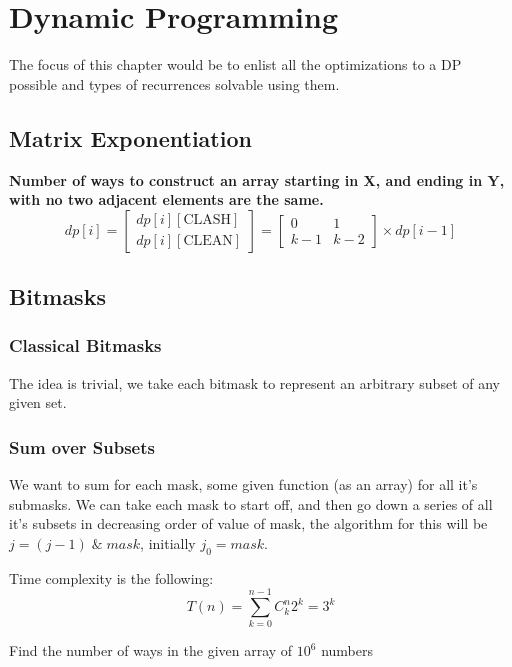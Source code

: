 \chapter{Dynamic Programming}

The focus of this chapter would be to enlist all the optimizations to a DP possible and types of recurrences solvable using them.



\section{Matrix Exponentiation}


\begin{example}{}
\textbf{Number of ways to construct an array starting in X, and ending in Y, with no two adjacent elements are the same.}
\begin{equation*}
    dp[i] = \begin{bmatrix} dp[i][\text{CLASH}] \\ dp[i][\text{CLEAN}] \end{bmatrix}
    = \begin{bmatrix} 0 & 1 \\ k-1 & k-2 \end{bmatrix} \times dp[i-1]
\end{equation*}
\end{example}


\section{Bitmasks}


\subsection{Classical Bitmasks}

The idea is trivial, we take each bitmask to represent an arbitrary subset of any given set.


\subsection{Sum over Subsets}

We want to sum for each mask, some given function (as an array) for all it's submasks.
We can take each mask to start off, and then go down a series of all it's subsets in decreasing order of value of mask, the algorithm for this will be $j = (j - 1)\;\&\;mask$, initially $j_0 = mask$.

Time complexity is the following:
\begin{equation}
    T(n) = \sum_{k=0}^{n-1} C^n_k 2^k = 3^k 
\end{equation}

\begin{example}
    Find the number of ways in the given array of $10^6$ numbers
\end{example}